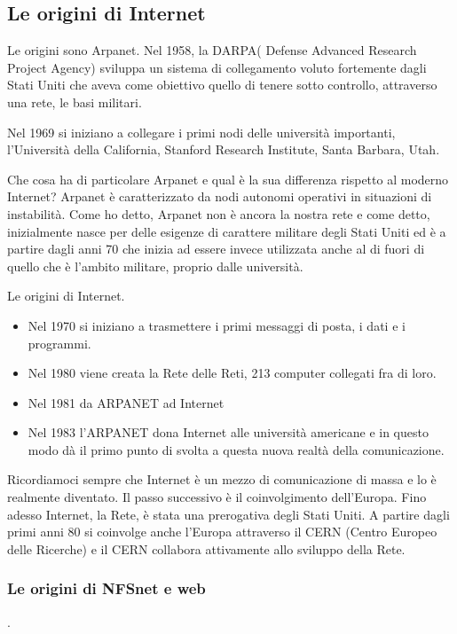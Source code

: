 \subsection{Le origini di Internet}

Le origini sono Arpanet. 
Nel 1958, la DARPA( Defense Advanced Research Project Agency) sviluppa un sistema di collegamento voluto fortemente dagli Stati Uniti che aveva come obiettivo quello di tenere sotto controllo, attraverso una rete, le basi militari. 

Nel 1969 si iniziano a collegare i primi nodi delle università importanti, l'Università della California, Stanford Research Institute, Santa Barbara, Utah. 

Che cosa ha di particolare Arpanet e qual è la sua differenza rispetto al moderno Internet? Arpanet è caratterizzato da nodi autonomi operativi in situazioni di instabilità. Come ho detto, Arpanet non è ancora la nostra rete e come detto, inizialmente nasce per delle esigenze di carattere militare degli Stati Uniti ed è a partire dagli anni 70 che inizia ad essere invece utilizzata anche al di fuori di quello che è l'ambito militare, proprio dalle università. 

Le origini di Internet. \par
\begin{itemize}
    \item Nel 1970 si iniziano a trasmettere i primi messaggi di posta, i dati e i programmi.
    \item Nel 1980 viene creata la Rete delle Reti, 213 computer collegati fra di loro.
    \item Nel 1981 da ARPANET ad Internet
    \item Nel 1983 l'ARPANET dona Internet alle università americane e in questo modo dà il primo punto di svolta a questa nuova realtà della comunicazione.
\end{itemize}

Ricordiamoci sempre che Internet è un mezzo di comunicazione di massa e lo è realmente diventato. Il passo successivo è il coinvolgimento dell'Europa. Fino adesso Internet, la Rete, è stata una prerogativa degli Stati Uniti. A partire dagli primi anni 80 si coinvolge anche l'Europa attraverso il CERN (Centro Europeo delle Ricerche) e il CERN collabora attivamente allo sviluppo della Rete.

\subsubsection{Le origini di NFSnet e web}.

